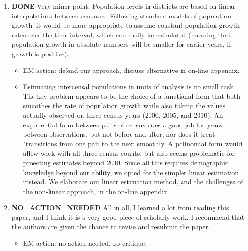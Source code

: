 \documentclass{article}
\begin{document}
\begin{enumerate}
\item {\bfseries\sffamily DONE} Very minor point: Population levels in districts are based on linear interpolations between censuses. Following standard models of population growth, it would be more appropriate to assume constant population growth rates over the time interval, which can easily be calculated (meaning that population growth in absolute numbers will be smaller for earlier years, if growth is positive).
\label{sec:orgheadline14}
\begin{itemize}
\item EM action: defend our approach, discuss alternative in on-line appendix.
\item Estimating intercensal populations in units of analysis is no small task. The key problem appears to be the choice of a functional form that both smoothes the rate of population growth while also taking the values actually observed on three census years (2000, 2005, and 2010). An exponential form between pairs of census does a good job for years between observations, but not before and after, nor does it treat "transitions from one pair to the next smoothly. A polinomial form would allow work with all three census counts, but also seems problematic for proecting estimates beyond 2010. Since all this requires demographic knowledge beyond our ability, we opted for the simpler linear estimation instead. We elaborate our linear estimation method, and the challenges of the non-linear approach, in the on-line appendix.
\end{itemize}
\item {\bfseries\sffamily NO\_ACTION\_NEEDED} All in all, I learned a lot from reading this paper, and I think it is a very good piece of scholarly work. I recommend that the authors are given the chance to revise and resubmit the paper.
\label{sec:orgheadline15}
\begin{itemize}
\item EM action: no action needed, no critique.
\end{itemize}
\end{enumerate}
\end{document}
